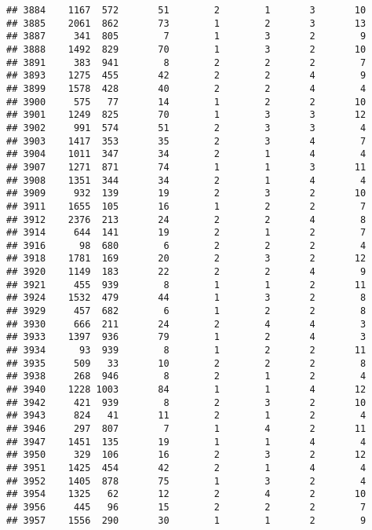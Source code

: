 \documentclass[]{article}
\begin{document}
\begin{verbatim}
## 3884    1167  572       51        2        1       3       10
## 3885    2061  862       73        1        2       3       13
## 3887     341  805        7        1        3       2        9
## 3888    1492  829       70        1        3       2       10
## 3891     383  941        8        2        2       2        7
## 3893    1275  455       42        2        2       4        9
## 3899    1578  428       40        2        2       4        4
## 3900     575   77       14        1        2       2       10
## 3901    1249  825       70        1        3       3       12
## 3902     991  574       51        2        3       3        4
## 3903    1417  353       35        2        3       4        7
## 3904    1011  347       34        2        1       4        4
## 3907    1271  871       74        1        1       3       11
## 3908    1351  344       34        2        1       4        4
## 3909     932  139       19        2        3       2       10
## 3911    1655  105       16        1        2       2        7
## 3912    2376  213       24        2        2       4        8
## 3914     644  141       19        2        1       2        7
## 3916      98  680        6        2        2       2        4
## 3918    1781  169       20        2        3       2       12
## 3920    1149  183       22        2        2       4        9
## 3921     455  939        8        1        1       2       11
## 3924    1532  479       44        1        3       2        8
## 3929     457  682        6        1        2       2        8
## 3930     666  211       24        2        4       4        3
## 3933    1397  936       79        1        2       4        3
## 3934      93  939        8        1        2       2       11
## 3935     509   33       10        2        2       2        8
## 3938     268  946        8        2        1       2        4
## 3940    1228 1003       84        1        1       4       12
## 3942     421  939        8        2        3       2       10
## 3943     824   41       11        2        1       2        4
## 3946     297  807        7        1        4       2       11
## 3947    1451  135       19        1        1       4        4
## 3950     329  106       16        2        3       2       12
## 3951    1425  454       42        2        1       4        4
## 3952    1405  878       75        1        3       2        4
## 3954    1325   62       12        2        4       2       10
## 3956     445   96       15        2        2       2        7
## 3957    1556  290       30        1        1       2        9

\end{verbatim}
\end{document}
